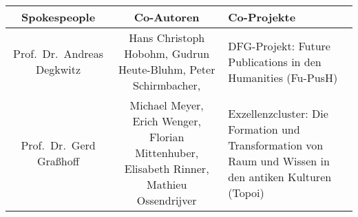 \documentclass[
]{article}
\begin{document}
\begin{longtable}[]{@{}ccl@{}}
\toprule
\begin{minipage}[b]{0.16\columnwidth}\centering
Spokespeople\strut
\end{minipage} & \begin{minipage}[b]{0.38\columnwidth}\centering
Co-Autoren\strut
\end{minipage} & \begin{minipage}[b]{0.38\columnwidth}\raggedright
Co-Projekte\strut
\end{minipage}\tabularnewline
\midrule
\endhead
\begin{minipage}[t]{0.16\columnwidth}\centering
Prof.~Dr.~Andreas Degkwitz\strut
\end{minipage} & \begin{minipage}[t]{0.38\columnwidth}\centering
Hans Christoph Hobohm, Gudrun Heute-Bluhm, Peter Schirmbacher,\strut
\end{minipage} & \begin{minipage}[t]{0.38\columnwidth}\raggedright
DFG-Projekt: Future Publications in den Humanities (Fu-PusH)\strut
\end{minipage}\tabularnewline
\begin{minipage}[t]{0.16\columnwidth}\centering
Prof.~Dr.~Gerd Graßhoff\strut
\end{minipage} & \begin{minipage}[t]{0.38\columnwidth}\centering
Michael Meyer, Erich Wenger, Florian Mittenhuber, Elisabeth Rinner,
Mathieu Ossendrijver\strut
\end{minipage} & \begin{minipage}[t]{0.38\columnwidth}\raggedright
Exzellenzcluster: Die Formation und Transformation von Raum und Wissen
in den antiken Kulturen (Topoi)\strut
\end{minipage}\tabularnewline
\bottomrule
\end{longtable}
\end{document}
